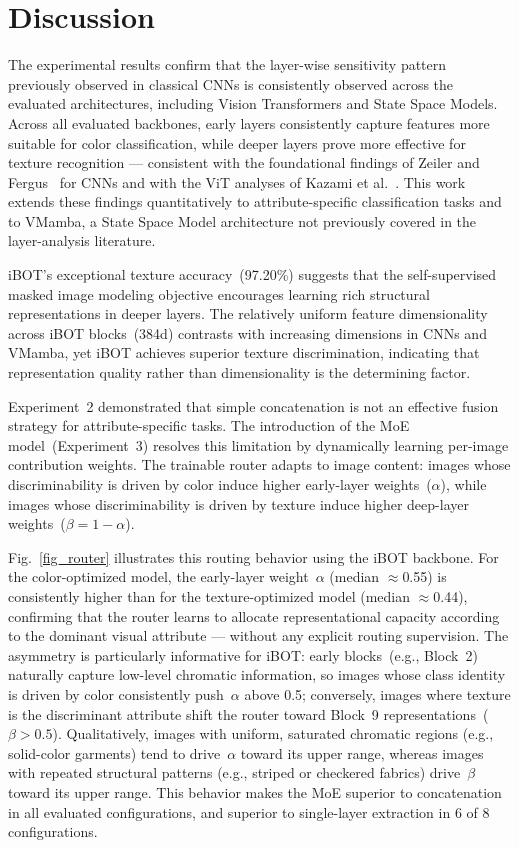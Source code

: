 \documentclass[conference]{IEEEtran}
\begin{document}
\section{Discussion}

The experimental results confirm that the layer-wise sensitivity pattern
previously observed in classical CNNs is consistently observed across the
evaluated architectures, including Vision Transformers and State Space
Models.
Across all evaluated backbones, early layers consistently capture features
more suitable for color classification, while deeper layers prove more
effective for texture recognition — consistent with the foundational
findings of Zeiler and Fergus~\cite{bzeiler} for CNNs and with the ViT
analyses of Kazami et al.~\cite{bkazami}.
This work extends these findings quantitatively to attribute-specific
classification tasks and to VMamba, a State Space Model architecture not
previously covered in the layer-analysis literature.

iBOT's exceptional texture accuracy~(97.20\%) suggests that the
self-supervised masked image modeling objective encourages learning rich
structural representations in deeper layers.
The relatively uniform feature dimensionality across iBOT blocks~(384d)
contrasts with increasing dimensions in CNNs and VMamba, yet iBOT achieves
superior texture discrimination, indicating that representation quality
rather than dimensionality is the determining factor.

Experiment~2 demonstrated that simple concatenation is not an effective
fusion strategy for attribute-specific tasks.
The introduction of the MoE model~(Experiment~3) resolves this limitation
by dynamically learning per-image contribution weights.
The trainable router adapts to image content: images whose discriminability
is driven by color induce higher early-layer weights~($\alpha$), while
images whose discriminability is driven by texture induce higher
deep-layer weights~($\beta = 1-\alpha$).

Fig.~\ref{fig_router} illustrates this routing behavior using the iBOT
backbone.
For the color-optimized model, the early-layer weight~$\alpha$ (median
$\approx$0.55) is consistently higher than for the texture-optimized
model (median $\approx$0.44), confirming that the router learns to
allocate representational capacity according to the dominant visual
attribute — without any explicit routing supervision.
The asymmetry is particularly informative for iBOT: early blocks~(e.g.,
Block~2) naturally capture low-level chromatic information, so images
whose class identity is driven by color consistently push~$\alpha$ above
0.5; conversely, images where texture is the discriminant attribute shift
the router toward Block~9 representations~($\beta > 0.5$).
Qualitatively, images with uniform, saturated chromatic regions (e.g.,
solid-color garments) tend to drive~$\alpha$ toward its upper range,
whereas images with repeated structural patterns (e.g., striped or
checkered fabrics) drive~$\beta$ toward its upper range.
This behavior makes the MoE superior to concatenation in all evaluated
configurations, and superior to single-layer extraction in 6 of 8
configurations.
\end{document}
